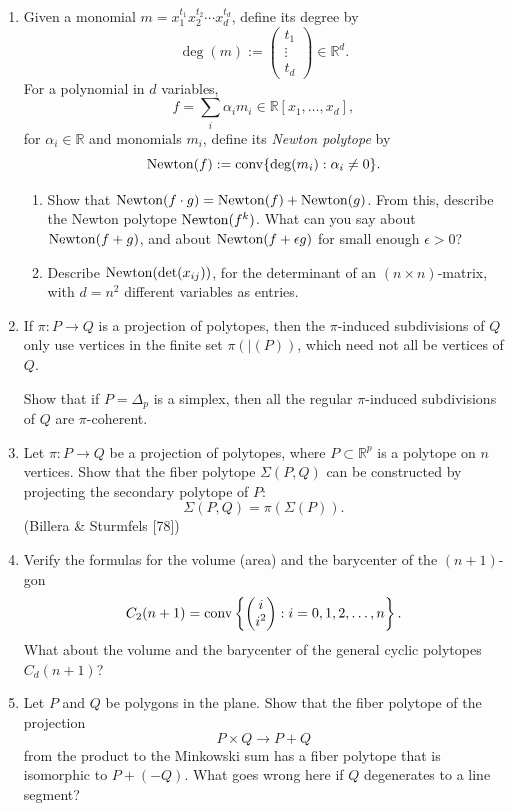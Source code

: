 \documentclass{article}
\begin{document}
\begin{enumerate}
\item Given a monomial $m = x_1^{t_1}x_2^{t_2}\cdots x_d^{t_d}$, define its degree by
\[
\deg(m) := \begin{pmatrix} t_1 \\ \vdots \\ t_d \end{pmatrix} \in \mathbb{R}^d.
\]
For a polynomial in $d$ variables,
\[
f = \sum_i \alpha_i m_i \in \mathbb{R}[x_1,\ldots,x_d],
\]
for $\alpha_i \in \mathbb{R}$ and monomials $m_i$, define its \emph{Newton polytope} by
\[
\operatorname{Newton}(f) := \operatorname{conv}\{\deg(m_i) : \alpha_i \neq 0\}.
\]
\begin{enumerate}[label=(\roman*)]
\item Show that $\operatorname{Newton}(f\cdot g) = \operatorname{Newton}(f) + \operatorname{Newton}(g)$. From this, describe the Newton polytope $\operatorname{Newton}(f^k)$. What can you say about $\operatorname{Newton}(f+g)$, and about $\operatorname{Newton}(f+\epsilon g)$ for small enough $\epsilon > 0$?
\item Describe $\operatorname{Newton}(\det(x_{ij}))$, for the determinant of an $(n \times n)$-matrix, with $d=n^2$ different variables as entries.
\end{enumerate}

\item If $\pi : P \longrightarrow Q$ is a projection of polytopes, then the $\pi$-induced subdivisions of $Q$ only use vertices in the finite set $\pi(\vert(P))$, which need not all be vertices of $Q$.

Show that if $P=\Delta_p$ is a simplex, then all the regular $\pi$-induced subdivisions of $Q$ are $\pi$-coherent.

\item Let $\pi : P \longrightarrow Q$ be a projection of polytopes, where $P \subset \mathbb{R}^p$ is a polytope on $n$ vertices. Show that the fiber polytope $\Sigma(P,Q)$ can be constructed by projecting the secondary polytope of $P$:
\[
\Sigma(P,Q) = \pi(\Sigma(P)).
\]
(Billera \& Sturmfels [78])

\item Verify the formulas for the volume (area) and the barycenter of the $(n+1)$-gon
\[
C_2(n+1) = \operatorname{conv}\left\{\begin{pmatrix} i \\ i^2 \end{pmatrix} : i=0,1,2,\ldots,n\right\}.
\]
What about the volume and the barycenter of the general cyclic polytopes $C_d(n+1)$?

\item Let $P$ and $Q$ be polygons in the plane. Show that the fiber polytope of the projection
\[
P \times Q \longrightarrow P+Q
\]
from the product to the Minkowski sum has a fiber polytope that is isomorphic to $P+(-Q)$. What goes wrong here if $Q$ degenerates to a line segment?


\end{enumerate}
\end{document}
